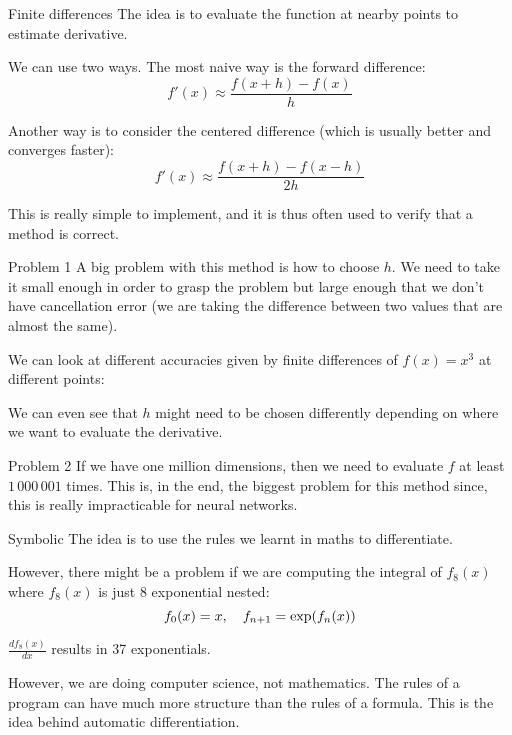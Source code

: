 \documentclass[a4paper]{article}
\begin{document}
\begin{parag}{Finite differences}
    The idea is to evaluate the function at nearby points to estimate derivative.

    We can use two ways. The most naive way is the forward difference: 
    \[f'\left(x\right) \approx \frac{f\left(x+h\right) - f\left(x\right)}{h}\]

    Another way is to consider the centered difference (which is usually better and converges faster): 
    \[f'\left(x\right) \approx \frac{f\left(x + h\right) - f\left(x - h\right)}{2h}\]

    This is really simple to implement, and it is thus often used to verify that a method is correct.
    
    \begin{subparag}{Problem 1}
        A big problem with this method is how to choose $h$. We need to take it small enough in order to grasp the problem but large enough that we don't have cancellation error (we are taking the difference between two values that are almost the same).

        We can look at different accuracies given by finite differences of $f\left(x\right) = x^3$ at different points:
        
        We can even see that $h$ might need to be chosen differently depending on where we want to evaluate the derivative.
    \end{subparag}

    \begin{subparag}{Problem 2}
        If we have one million dimensions, then we need to evaluate $f$ at least $1\,000\,001$ times. This is, in the end, the biggest problem for this method since, this is really impracticable for neural networks.
    \end{subparag}
    
\end{parag}

\begin{parag}{Symbolic}
    The idea is to use the rules we learnt in maths to differentiate.

    However, there might be a problem if we are computing the integral of $f_8\left(x\right)$ where $f_8\left(x\right)$ is just 8 exponential nested: 
    \[f_0\left(x\right) = x, \mathspace f_{n+1} = \exp\left(f_n\left(x\right)\right)\]

    $\frac{df_8\left(x\right)}{dx}$ results in 37 exponentials.

    However, we are doing computer science, not mathematics. The rules of a program can have much more structure than the rules of a formula. This is the idea behind automatic differentiation.
\end{parag}
\end{document}
